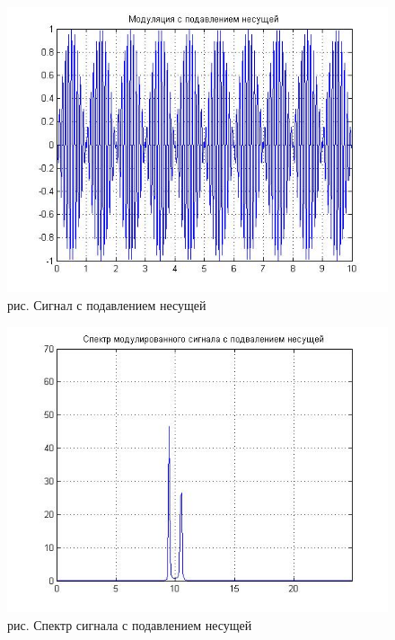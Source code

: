\documentclass[10pt,a4paper]{report}
\begin{document}
\begin{figure}
\begin{center}
\includegraphics[angle=0, scale = 0.6]{7_5.jpg}\newline
рис. Сигнал с подавлением несущей\newline
\end{center}
\end{figure}
\begin{figure}
\begin{center}
\includegraphics[angle=0, scale = 0.6]{7_6.jpg}\newline
рис. Спектр сигнала с подавлением несущей\newline
\end{center}
\end{figure}
\end{document}
